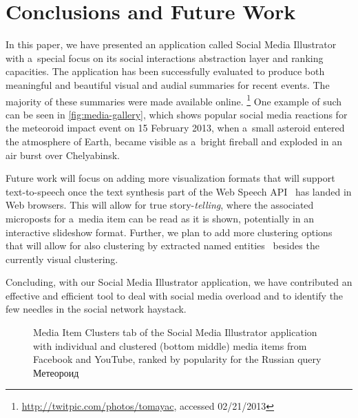 \documentclass{sig-alternate}
\newcommand{\inlinelistingsize}{\fontsize{8pt}{11pt}}
\let\oldurl\url
\renewcommand{\url}[1]{\inlinelistingsize\oldurl{#1}}
\begin{document}
\section{Conclusions and Future Work}

In this paper, we have presented an application called Social Media Illustrator with
a~special focus on its social interactions abstraction layer and ranking capacities.
The application has been successfully evaluated to produce both meaningful and beautiful
visual and audial summaries for recent events.
The majority of these summaries were made available online.%
\footnote{\url{http://twitpic.com/photos/tomayac}, accessed 02/21/2013}
One example of such can be seen in \autoref{fig:media-gallery},
which shows popular social media reactions for the meteoroid impact event
on 15 February 2013, when a~small asteroid entered the atmosphere of Earth,
became visible as a~bright fireball
and exploded in an air burst over Chelyabinsk.

Future work will focus on adding more visualization formats that will support
text-to-speech once the text synthesis part
of the Web Speech API~\cite{shires2012webspeech} has landed in Web browsers.
This will allow for true story-\emph{telling}, where the associated microposts
for a~media item can be read as it is shown,
potentially in an interactive slideshow format.
Further, we plan to add more clustering options
that will allow for also clustering by extracted named entities~%
\cite{steiner2011addingmeaning} besides the currently visual clustering.

Concluding, with our Social Media Illustrator application, 
we have contributed an effective and efficient tool
to deal with social media overload
and to identify the few needles in the social network haystack. 

\begin{figure}[t!]
  \centering
  \setlength{\fboxsep}{1pt}
  \caption{Media Item Clusters tab of the Social Media Illustrator application
  with individual and clustered (bottom middle) media items from Facebook and YouTube,
  ranked by popularity for the Russian query
    \selectfont Метеороид \selectfont}
  \label{fig:application}
\end{figure}
\end{document}
